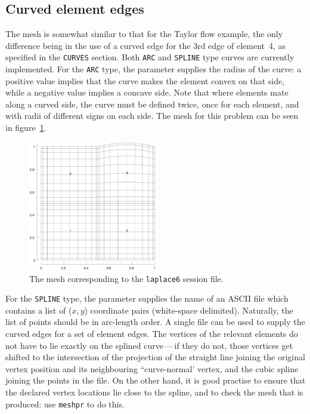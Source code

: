 \documentclass[11pt,a4paper]{report}
\begin{document}
\subsection{Curved element edges}

The mesh is somewhat similar to that for the Taylor flow example, the
only difference being in the use of a curved edge for the 3rd edge of
element~4, as specified in the \texttt{CURVES} section.  Both
\texttt{ARC} and \texttt{SPLINE} type curves are currently
implemented.  For the \texttt{ARC} type, the parameter supplies the
radius of the curve: a positive value implies that the curve makes the
element convex on that side, while a negative value implies a concave
side.  Note that where elements mate along a curved side, the curve
must be defined twice, once for each element, and with radii of
different signs on each side.  The mesh for this problem can be seen
in figure~\ref{lapcurve}.

\begin{figure}
\begin{center}
\includegraphics[width=0.5\textwidth]{laplace6mesh.eps}
\end{center}
\caption{
\label{lapcurve}
  The mesh corresponding to the \texttt{laplace6} session file.
}
\end{figure}

For the \texttt{SPLINE} type, the parameter supplies the name of an
ASCII file which contains a list of ($x$,\,$y$) coordinate pairs
(white-space delimited). Naturally, the list of points should be in
arc-length order. A single file can be used to supply the curved edges
for a set of element edges. The vertices of the relevant elements do
not have to lie exactly on the splined curve\,---\,if they do not,
those vertices get shifted to the intersection of the projection of
the straight line joining the original vertex position and its
neighbouring ``curve-normal' vertex, and the cubic spline joining the
points in the file. On the other hand, it is good practise to ensure
that the declared vertex locations lie close to the spline, and to
check the mesh that is produced: use \texttt{meshpr} to do this.
\end{document}
